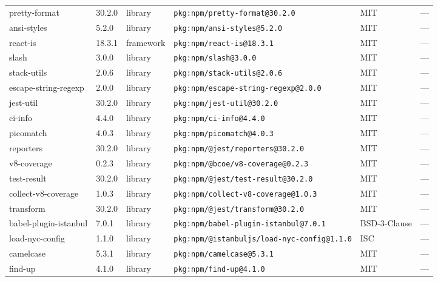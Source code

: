 \documentclass[11pt,a4paper]{article}
\begin{document}
\begin{longtable}{|p{4cm}|p{2cm}|p{1.6cm}|p{5cm}|p{1.5cm}|p{3.5cm}|}
\raggedright pretty-format & 30.2.0 & library & \small\texttt{pkg:npm/pretty-format@30.2.0} & MIT & \small — \\
\raggedright ansi-styles & 5.2.0 & library & \small\texttt{pkg:npm/ansi-styles@5.2.0} & MIT & \small — \\
\raggedright react-is & 18.3.1 & framework & \small\texttt{pkg:npm/react-is@18.3.1} & MIT & \small — \\
\raggedright slash & 3.0.0 & library & \small\texttt{pkg:npm/slash@3.0.0} & MIT & \small — \\
\raggedright stack-utils & 2.0.6 & library & \small\texttt{pkg:npm/stack-utils@2.0.6} & MIT & \small — \\
\raggedright escape-string-regexp & 2.0.0 & library & \small\texttt{pkg:npm/escape-string-regexp@2.0.0} & MIT & \small — \\
\raggedright jest-util & 30.2.0 & library & \small\texttt{pkg:npm/jest-util@30.2.0} & MIT & \small — \\
\raggedright ci-info & 4.4.0 & library & \small\texttt{pkg:npm/ci-info@4.4.0} & MIT & \small — \\
\raggedright picomatch & 4.0.3 & library & \small\texttt{pkg:npm/picomatch@4.0.3} & MIT & \small — \\
\raggedright reporters & 30.2.0 & library & \small\texttt{pkg:npm/@jest/reporters@30.2.0} & MIT & \small — \\
\raggedright v8-coverage & 0.2.3 & library & \small\texttt{pkg:npm/@bcoe/v8-coverage@0.2.3} & MIT & \small — \\
\raggedright test-result & 30.2.0 & library & \small\texttt{pkg:npm/@jest/test-result@30.2.0} & MIT & \small — \\
\raggedright collect-v8-coverage & 1.0.3 & library & \small\texttt{pkg:npm/collect-v8-coverage@1.0.3} & MIT & \small — \\
\raggedright transform & 30.2.0 & library & \small\texttt{pkg:npm/@jest/transform@30.2.0} & MIT & \small — \\
\raggedright babel-plugin-istanbul & 7.0.1 & library & \small\texttt{pkg:npm/babel-plugin-istanbul@7.0.1} & BSD-3-Clause & \small — \\
\raggedright load-nyc-config & 1.1.0 & library & \small\texttt{pkg:npm/@istanbuljs/load-nyc-config@1.1.0} & ISC & \small — \\
\raggedright camelcase & 5.3.1 & library & \small\texttt{pkg:npm/camelcase@5.3.1} & MIT & \small — \\
\raggedright find-up & 4.1.0 & library & \small\texttt{pkg:npm/find-up@4.1.0} & MIT & \small — \\

\end{longtable}
\end{document}
